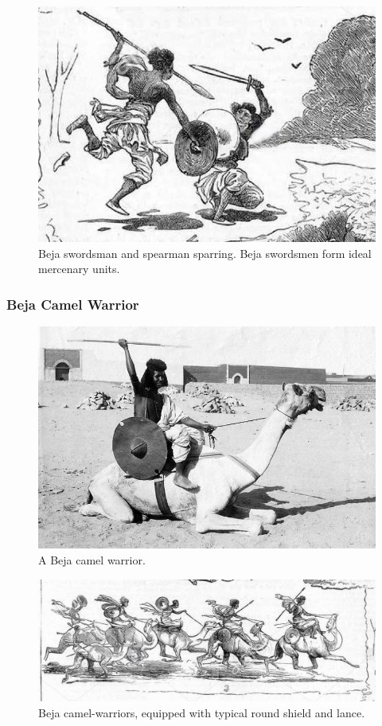 \documentclass[a4paper,12pt]{scrreprt}
\begin{document}
\begin{figure}[H]
	\centering
	\includegraphics[width=\textwidth]{img/beja/beja_swords_and_spearman}
	\caption{Beja swordsman and spearman sparring. Beja swordsmen form ideal mercenary units.}
\end{figure}

\subsubsection{Beja Camel Warrior}

\begin{figure}[H]
	\centering
	\includegraphics[width=\textwidth]{img/beja/beja_camel_warrior}
	\caption{A Beja camel warrior.}
\end{figure}

\begin{figure}[H]
	\centering
	\includegraphics[width=\textwidth]{img/beja/beja_camel_warriors}
	\caption{Beja camel-warriors, equipped with typical round shield and lance.}
\end{figure}
\end{document}
